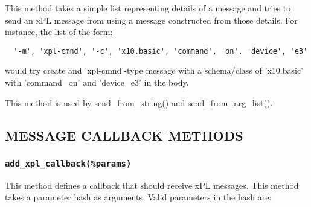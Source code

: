 This method takes a simple list representing details of a message
and tries to send an xPL message from using a message constructed
from those details.  For instance, the list of the form:

\begin{verbatim}
  '-m', 'xpl-cmnd', '-c', 'x10.basic', 'command', 'on', 'device', 'e3'
\end{verbatim}


would try create and 'xpl-cmnd'-type message with a schema/class of
'x10.basic' with 'command=on' and 'device=e3' in the body.



This method is used by \textsf{send\_from\_string()} and
\textsf{send\_from\_arg\_list()}.

\subsection*{MESSAGE CALLBACK METHODS\label{xPL::Listener_MESSAGE_CALLBACK_METHODS}}
\subsubsection*{\texttt{add\_xpl\_callback(\%params)}\label{xPL::Listener_add_xpl_callback_params_}}


This method defines a callback that should receive xPL messages.
This method takes a parameter hash as arguments.  Valid parameters in
the hash are:

